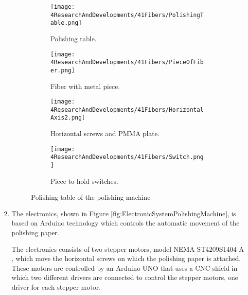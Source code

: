 \begin{enumerate}
\begin{figure}
\centering
    \begin{subfigure}[b]{0.55\textwidth}
    \centering
    \texttt{[image: 4ResearchAndDevelopments/41Fibers/PolishingTable.png]}  
    \caption{Polishing table.\label{subfig:PolishingTable}}
    \end{subfigure}
    \hfill
    \begin{subfigure}[b]{0.3\textwidth}
    \centering
    \texttt{[image: 4ResearchAndDevelopments/41Fibers/PieceOfFiber.png]}  
    \caption{Fiber with metal piece.\label{subfig:FiberMetailcPiece}}
    \end{subfigure}
    \hfill
    \begin{subfigure}[b]{0.55\textwidth}
    \centering
    \texttt{[image: 4ResearchAndDevelopments/41Fibers/HorizontalAxis2.png]}  
    \caption{Horizontal screws and PMMA plate.\label{subfig:HorizontalAxis}}
    \end{subfigure}
    \hfill
    \begin{subfigure}[b]{0.4\textwidth}
    \centering
    \texttt{[image: 4ResearchAndDevelopments/41Fibers/Switch.png]}  
    \caption{Piece to hold switches.\label{subfig:3DSwitchPiece}}
    \end{subfigure}
 \caption{Polishing table of the polishing machine}
 \label{fig:PolishingTable}
\end{figure}

\item{} The electronics, shown in Figure \ref{fig:ElectronicSystemPolishingMachine}, is based on Arduino technology which controls the automatic movement of the polishing paper.

The electronics consists of two stepper motors, model NEMA ST4209S1404-A \cite{StepperMotors}, which move the horizontal screws on which the polishing paper is attached. These motors are controlled by an Arduino UNO \cite{ArduinoUNO} that uses a CNC shield \cite{CNCShield} in which two different drivers are connected to control the stepper motors, one driver for each stepper motor.


\end{enumerate}
